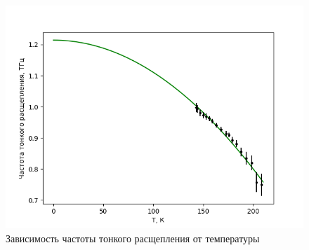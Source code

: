 \begin{figure}[!h]
    \begin{center}
        \includegraphics[width=0.9 \linewidth]{delta_frequence.png}
        \caption{Зависимость частоты тонкого расщепления от температуры}
        \label{delta_frequence}
    \end{center}
\end{figure}
